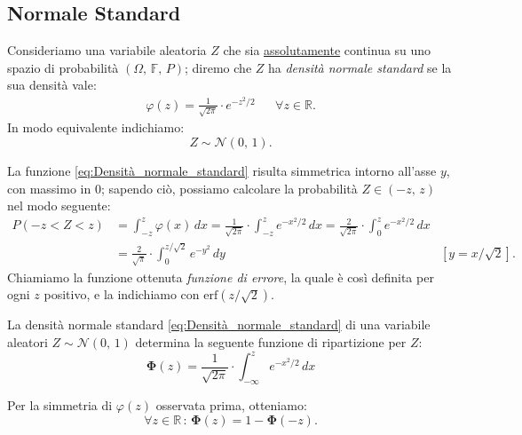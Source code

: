         \subsection{Normale Standard}
            \begin{defn}
                Consideriamo una variabile aleatoria $Z$ che sia \underline{assolutamente} continua su uno spazio di probabilità $(\Omega,\,\mathbb{F},\,P)$; diremo che $Z$ ha \emph{densità normale standard} se la sua densità vale:
                \begin{align}\label{eq:Densità_normale_standard} 
                    \varphi(z) = \frac{1}{\sqrt{2\pi}} \cdot e^{-z^2/2} & &\forall z \in \mathbb{R}
                .\end{align}
                In modo equivalente indichiamo: \[
                    Z \sim \mathcal{N}(0,\, 1)
                .\]
            \end{defn}
            \begin{obsv}
                La funzione \eqref{eq:Densità_normale_standard} risulta simmetrica intorno all'asse $y$, con massimo in 0; sapendo ciò, possiamo calcolare la probabilità $Z \in (-z,\, z)$ nel modo seguente:
                \begin{align*}
                    P(-z < Z < z) &= \int_{-z}^{z} \varphi(x)\, dx = \frac{1}{\sqrt{2\pi}} \cdot \int_{-z}^{z} e^{-x^2/2}\, dx = \frac{2}{\sqrt{2\pi}} \cdot \int_{0}^{z} e^{-x^2/2}\, dx \\
                                  &= \frac{2}{\sqrt{\pi}} \cdot \int_{0}^{z /\sqrt{2}} e^{-y^2}\, dy & [y = x /\sqrt{2}] 
                .\end{align*}
                Chiamiamo la funzione ottenuta \emph{funzione di errore}, la quale è così definita per ogni $z$ positivo, e la indichiamo con $\text{erf}(z /\sqrt{2})$.
            \end{obsv}
            \begin{prty}
                La densità normale standard \eqref{eq:Densità_normale_standard} di una variabile aleatori $Z \sim \mathcal{N}(0,\,1)$ determina la seguente funzione di ripartizione per $Z$:
                \begin{equation}\label{eq:Ripartizione_normale_standard}
                    \mathbf{\Phi}(z) = \frac{1}{\sqrt{2\pi}} \cdot \int_{-\infty}^{z} e^{-x^2 /2}\, dx
                \end{equation}
            \end{prty}
            \begin{obsv}
                Per la simmetria di $\varphi(z)$ osservata prima, otteniamo: \[
                    \forall z \in \mathbb{R} \,:\, \mathbf{\Phi}(z) = 1 - \mathbf{\Phi}(-z)
                .\] 
            \end{obsv}
